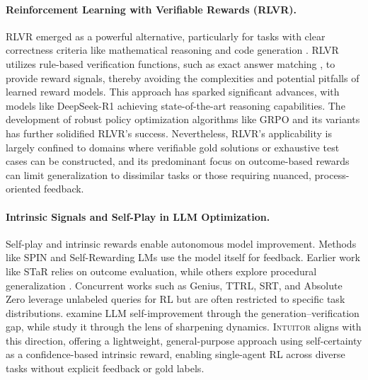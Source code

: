 \documentclass{article} %
\newcommand{\methodname}{\textsc{Intuitor}\xspace}
\begin{document}
\paragraph{Reinforcement Learning with Verifiable Rewards (RLVR).} RLVR emerged as a powerful alternative, particularly for tasks with clear correctness criteria like mathematical reasoning and code generation \citep{hu2025open,team2025kimi,xiaomi2025mimo}. RLVR utilizes rule-based verification functions, such as exact answer matching \citep{guo2025deepseek,team2025kimi,xiaomi2025mimo,jaech2024openai}, to provide reward signals, thereby avoiding the complexities and potential pitfalls of learned reward models. This approach has sparked significant advances, with models like DeepSeek-R1 \citep{guo2025deepseek} achieving state-of-the-art reasoning capabilities. The development of robust policy optimization algorithms like GRPO \citep{shao2024deepseekmath} and its variants \citep{deepcoder2025,liu2025understanding} has further solidified RLVR's success. Nevertheless, RLVR's applicability is largely confined to domains where verifiable gold solutions or exhaustive test cases can be constructed, and its predominant focus on outcome-based rewards can limit generalization to dissimilar tasks or those requiring nuanced, process-oriented feedback. 


\paragraph{Intrinsic Signals and Self-Play in LLM Optimization.} Self-play and intrinsic rewards enable autonomous model improvement. Methods like SPIN \citep{chen2024spin} and Self-Rewarding LMs \citep{yuan2024selfrewarding} use the model itself for feedback. Earlier work like STaR \citep{zelikman2022star} relies on outcome evaluation, while others explore procedural generalization \citep{poesia2024minimo,cheng2024spag}. Concurrent works such as Genius, TTRL, SRT, and Absolute Zero \citep{xu2025genius,zuo2025ttrl,shafayat2025can,zhao2025absolute} leverage unlabeled queries for RL but are often restricted to specific task distributions. \citet{song2025mind} examine LLM self-improvement through the generation–verification gap, while \citet{huang2025self} study it through the lens of sharpening dynamics. \methodname aligns with this direction, offering a lightweight, general-purpose approach using self-certainty as a confidence-based intrinsic reward, enabling single-agent RL across diverse tasks without explicit feedback or gold labels.
\end{document}
